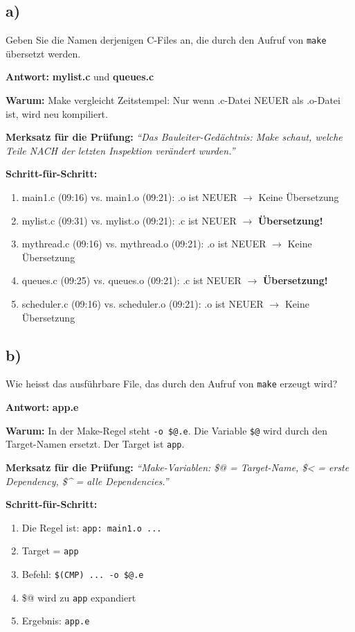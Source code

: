 \documentclass[a4paper,11pt]{article}
\begin{document}
\subsection*{a)}
Geben Sie die Namen derjenigen C-Files an, die durch den Aufruf von \texttt{make} übersetzt werden.

\begin{tcolorbox}[colback=green!15!white,colframe=green!70!black,title=\textbf{Lösung Aufgabe 3a}]
\textbf{Antwort:} \textbf{mylist.c} und \textbf{queues.c}

\textbf{Warum:} Make vergleicht Zeitstempel: Nur wenn .c-Datei NEUER als .o-Datei ist, wird neu kompiliert.

\textbf{Merksatz für die Prüfung:} \textit{``Das Bauleiter-Gedächtnis: Make schaut, welche Teile NACH der letzten Inspektion verändert wurden.''}

\textbf{Schritt-für-Schritt:}
\begin{enumerate}[leftmargin=*]
  \item main1.c (09:16) vs. main1.o (09:21): .o ist NEUER $\rightarrow$ Keine Übersetzung
  \item mylist.c (09:31) vs. mylist.o (09:21): .c ist NEUER $\rightarrow$ \textbf{Übersetzung!}
  \item mythread.c (09:16) vs. mythread.o (09:21): .o ist NEUER $\rightarrow$ Keine Übersetzung
  \item queues.c (09:25) vs. queues.o (09:21): .c ist NEUER $\rightarrow$ \textbf{Übersetzung!}
  \item scheduler.c (09:16) vs. scheduler.o (09:21): .o ist NEUER $\rightarrow$ Keine Übersetzung
\end{enumerate}
\end{tcolorbox}

\subsection*{b)}
Wie heisst das ausführbare File, das durch den Aufruf von \texttt{make} erzeugt wird?

\begin{tcolorbox}[colback=green!15!white,colframe=green!70!black,title=\textbf{Lösung Aufgabe 3b}]
\textbf{Antwort:} \textbf{app.e}

\textbf{Warum:} In der Make-Regel steht \texttt{-o \$@.e}. Die Variable \texttt{\$@} wird durch den Target-Namen ersetzt. Der Target ist \texttt{app}.

\textbf{Merksatz für die Prüfung:} \textit{``Make-Variablen: \$@ = Target-Name, \$< = erste Dependency, \$^ = alle Dependencies.''}

\textbf{Schritt-für-Schritt:}
\begin{enumerate}[leftmargin=*]
  \item Die Regel ist: \texttt{app: main1.o ...}
  \item Target = \texttt{app}
  \item Befehl: \texttt{\$(CMP) ... -o \$@.e}
  \item \$@ wird zu \texttt{app} expandiert
  \item Ergebnis: \texttt{app.e}
\end{enumerate}
\end{tcolorbox}
\end{document}
